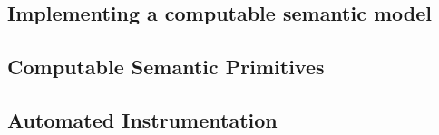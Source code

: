 \subsection{Implementing a computable semantic model}

\subsection{Computable Semantic Primitives}

\subsection{Automated Instrumentation}
